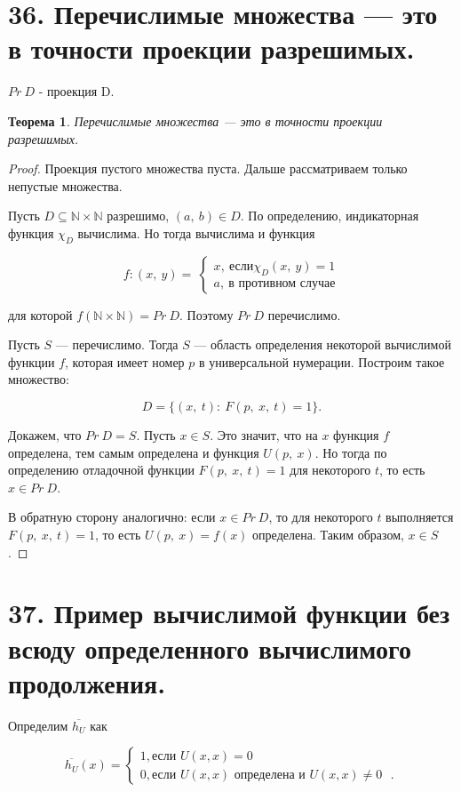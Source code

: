 \documentclass[a4paper, 12pt]{article}
\newtheorem*{theorem}{Теорема}
\newcommand{\N}{\mathbb{N}}
\begin{document}
\section*{36. Перечислимые множества — это в точности проекции разрешимых.}

$Pr\ D$ - проекция D.

\begin{theorem}
    Перечислимые множества — это в точности проекции разрешимых.
\end{theorem}

\begin{proof}
Проекция пустого множества пуста. Дальше рассматриваем только непустые множества.
    
Пусть $D \subseteq \N \times \N$ разрешимо, $(a,\ b) \in D$. По определению, индикаторная функция $\chi_D$ вычислима. Но тогда вычислима и функция

\[
    f: (x,\ y) =\  
    \begin{cases}
        x,\ \text{если} \chi_D(x,\ y) = 1 \\
        a,\ \text{в противном случае}
    \end{cases}
\]

для которой $f(\N \times \N) = Pr\ D$. Поэтому $Pr\ D$ перечислимо.

Пусть $S$ — перечислимо. Тогда $S$ — область определения некоторой вычислимой
функции $f$, которая имеет номер $p$ в универсальной нумерации. Построим такое
множество:

\[
    D = \{(x,\ t) :\  F(p,\ x,\ t) = 1\}.
\]

Докажем, что $Pr\ D = S$. Пусть $x \in S$. Это значит, что на $x$ функция $f$ определена, тем самым определена и функция $U(p,\ x)$. Но тогда по определению отладочной функции $F(p,\ x,\ t) = 1$ для некоторого $t$, то есть $x \in Pr\ D$.

В обратную сторону аналогично: если $x \in Pr\ D$, то для некоторого $t$ выполняется $F(p,\ x,\ t) = 1$, то есть $U(p,\ x) = f(x)$ определена. Таким образом, $x \in S$.

\end{proof}

\section*{37. Пример вычислимой функции без всюду определенного вычислимого продолжения.}

Определим $\overline{h_U}$ как

    \[
        \overline{h_{U}}(x) =
        \begin{cases}
            1, \text{если $U(x, x) = 0$} \\
            0, \text{если $U(x, x)$ определена и $U(x, x) \neq 0$ }.
        \end{cases}
    \]
\end{document}
